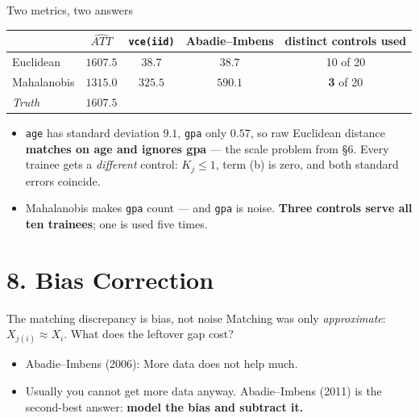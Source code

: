 \documentclass[
  11pt,
  ignorenonframetext,
  aspectratio=169,
]{beamer}
\providecommand{\tightlist}{%
  \setlength{\itemsep}{0pt}\setlength{\parskip}{0pt}}
\begin{document}
\begin{frame}[fragile]{Two metrics, two answers}
\protect{}\label{two-metrics-two-answers}
\begin{center}
\small
\begin{tabular}{lcccc}
\toprule
 & $\widehat{ATT}$ & \texttt{vce(iid)} & \textbf{Abadie--Imbens} & distinct controls used \\
\midrule
Euclidean    & $1607.5$ & $38.7$  & $38.7$  & 10 of 20 \\
Mahalanobis  & $1315.0$ & $325.5$ & $590.1$ & \textbf{3} of 20 \\
\midrule
\emph{Truth} & $1607.5$ & & & \\
\bottomrule
\end{tabular}
\end{center}

\begin{itemize}
\tightlist
\item
  \texttt{age} has standard deviation \(9.1\), \texttt{gpa} only
  \(0.57\), so raw Euclidean distance \textbf{matches on age and ignores
  gpa} --- the scale problem from §6. Every trainee gets a
  \emph{different} control: \(K_j \leq 1\), term (b) is zero, and both
  standard errors coincide.
\item
  Mahalanobis makes \texttt{gpa} count --- and \texttt{gpa} is noise.
  \textbf{Three controls serve all ten trainees}; one is used five
  times.
\end{itemize}
\end{frame}

\section{8. Bias Correction}\label{bias-correction}

\begin{frame}{The matching discrepancy is bias, not noise}
\protect{}\label{the-matching-discrepancy-is-bias-not-noise}
Matching was only \emph{approximate}: \(X_{j(i)} \approx X_i\). What
does the leftover gap cost?

\begin{itemize}
\tightlist
\item
  Abadie--Imbens (2006): More data does not help much.
\end{itemize}

\begin{itemize}
\tightlist
\item
  Usually you cannot get more data anyway. Abadie--Imbens (2011) is the
  second-best answer: \textbf{model the bias and subtract it.}
\end{itemize}
\end{frame}
\end{document}
